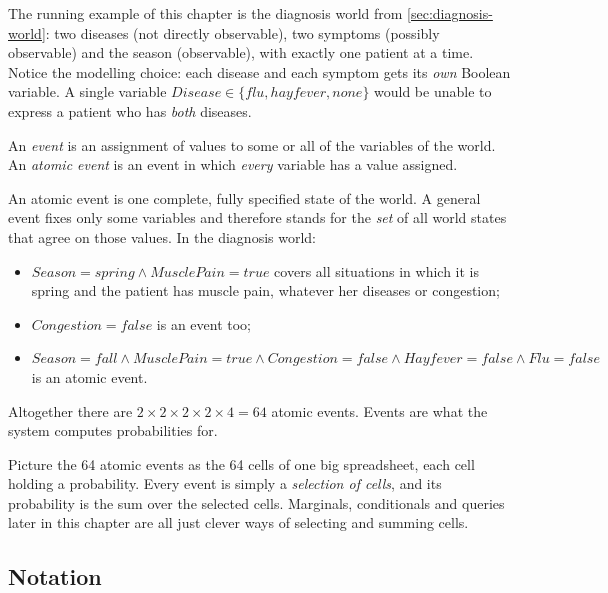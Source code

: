 \documentclass[11pt, oneside]{book}
\newcommand{\vn}[1]{\mathit{#1}}         %
\let\originalsubsection\subsection
\renewcommand{\subsection}{\Needspace{6\baselineskip}\originalsubsection}
\begin{document}
The running example of this chapter is the diagnosis world from
\cref{sec:diagnosis-world}: two diseases (not directly observable), two
symptoms (possibly observable) and the season (observable), with exactly one
patient at a time. Notice the modelling choice: each disease and each symptom
gets its \emph{own} Boolean variable. A single variable
$\vn{Disease} \in \{\vn{flu}, \vn{hayfever}, \vn{none}\}$ would be unable to
express a patient who has \emph{both} diseases.

\begin{defbox}[title={Events and atomic events}]
An \emph{event} is an assignment of values to some or all of the variables of
the world. An \emph{atomic event} is an event in which \emph{every} variable
has a value assigned.
\end{defbox}

An atomic event is one complete, fully specified state of the world. A general
event fixes only some variables and therefore stands for the \emph{set} of all
world states that agree on those values. In the diagnosis world:
\begin{itemize}
  \item $\vn{Season} = \vn{spring} \wedge \vn{MusclePain} = \vn{true}$ covers
    all situations in which it is spring and the patient has muscle pain,
    whatever her diseases or congestion;
  \item $\vn{Congestion} = \vn{false}$ is an event too;
  \item $\vn{Season} = \vn{fall} \wedge \vn{MusclePain} = \vn{true} \wedge
    \vn{Congestion} = \vn{false} \wedge \vn{Hayfever} = \vn{false} \wedge
    \vn{Flu} = \vn{false}$ is an atomic event.
\end{itemize}
Altogether there are $2 \times 2 \times 2 \times 2 \times 4 = 64$ atomic
events. Events are what the system computes probabilities for.

\begin{intbox}[unbreakable]
Picture the 64 atomic events as the 64 cells of one big spreadsheet, each cell
holding a probability. Every event is simply a \emph{selection of cells}, and
its probability is the sum over the selected cells. Marginals, conditionals and
queries later in this chapter are all just clever ways of selecting and summing
cells.
\end{intbox}

\subsection{Notation}
\end{document}
